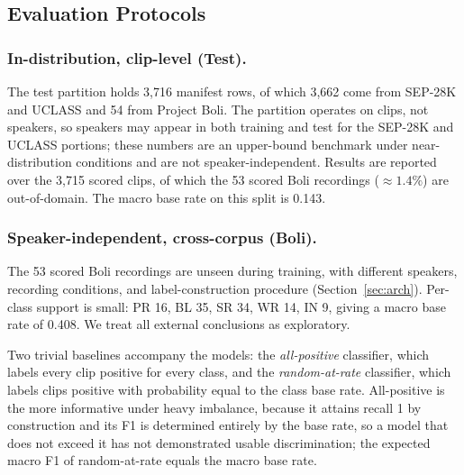 \documentclass[a4paper,orivec]{llncs}
\begin{document}
\subsection{Evaluation Protocols}
\subsubsection{In-distribution, clip-level (Test).}
The test partition holds 3{,}716 manifest rows, of which 3{,}662 come from
SEP-28K and UCLASS and 54 from Project Boli. The partition operates on clips, not
speakers, so speakers may appear in both training and test for the SEP-28K and
UCLASS portions; these numbers are an upper-bound benchmark under
near-distribution conditions and are not speaker-independent. Results are
reported over the 3{,}715 scored clips, of which the 53 scored Boli recordings
(${\approx}1.4\%$) are out-of-domain. The macro base rate on this split is 0.143.

\subsubsection{Speaker-independent, cross-corpus (Boli).}
The 53 scored Boli recordings are unseen during training, with different speakers,
recording conditions, and label-construction procedure (Section~\ref{sec:arch}).
Per-class support is small: PR 16, BL 35, SR 34, WR 14, IN 9, giving a macro base
rate of 0.408. We treat all external conclusions as exploratory.

Two trivial baselines accompany the models: the \emph{all-positive} classifier,
which labels every clip positive for every class, and the \emph{random-at-rate}
classifier, which labels clips positive with probability equal to the class base
rate. All-positive is the more informative under heavy imbalance, because it
attains recall 1 by construction and its F1 is determined entirely by the base
rate, so a model that does not exceed it has not demonstrated usable
discrimination; the expected macro F1 of random-at-rate equals the macro base
rate.
\end{document}
